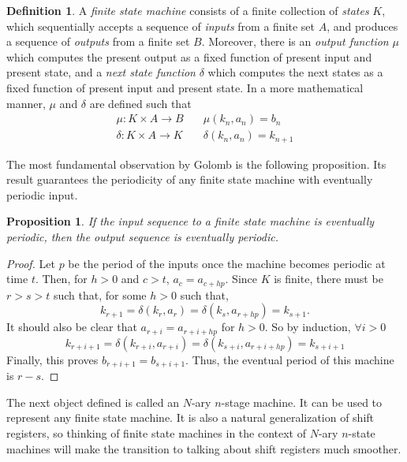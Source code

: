\documentclass[english]{article}
\theoremstyle{plain}
\newtheorem{proposition}[theorem]{Proposition}%
\theoremstyle{definition}
\newtheorem{definition}[theorem]{Definition}%
\theoremstyle{remark}
\begin{document}
\begin{definition}\label{finite-state-machine}
  A {\em finite state machine} consists of a finite collection of {\em states}
  $K$, which sequentially accepts a sequence of {\em inputs} from a finite set
  $A$, and produces a sequence of {\em outputs} from a finite set
  $B$. Moreover, there is an {\em output function} $\mu$ which computes
  the present output as a fixed function of present input and present state,
  and a
  {\em next state function} $\delta$ which computes the next states as a fixed
  function of present input and present state. In a more mathematical manner,
  $\mu$ and $\delta$ are defined such that
  \begin{eqnarray}
    \mu:K \times A \rightarrow B \quad &\mu(k_n,a_n)=b_n \\
    \delta:K \times A \rightarrow K \quad &\delta(k_n,a_n)=k_{n+1}
  \end{eqnarray}
\end{definition}


\par The most fundamental observation by Golomb is the following proposition.
Its result guarantees the periodicity of any finite state machine with
eventually periodic input.

\begin{proposition}\label{prop:golomb-2}
  If the input sequence to a finite state machine is eventually periodic, then
  the output sequence is eventually periodic.
\end{proposition}
\begin{proof}
  Let $p$ be the period of the inputs once the machine becomes periodic at time
  $t$. Then, for $h>0$ and $c>t$, $a_c=a_{c+hp}$. Since $K$ is finite, there
  must be $r>s>t$ such that, for some $h>0$ such that,
  \[
  k_{r+1}=\delta(k_r,a_r)=\delta(k_s,a_{r+hp})=k_{s+1}.
  \]
  It should also be clear that $a_{r+i}=a_{r+i+hp}$ for $h>0$. So by induction,
  $\forall i>0$
  \[
  k_{r+i+1}=\delta(k_{r+i},a_{r+i})=\delta(k_{s+i},a_{r+i+hp})=k_{s+i+1}
  \]
  Finally, this proves $b_{r+i+1}=b_{s+i+1}$. Thus, the eventual period of this
  machine is $r-s$.
\end{proof}

\par The next object defined is called an $N$-ary $n$-stage machine. It can be
used to represent any finite state machine. It is also a natural generalization
of shift registers, so thinking of finite state machines in the context of
$N$-ary $n$-state machines will make the transition to talking about shift
registers much smoother.
\end{document}
